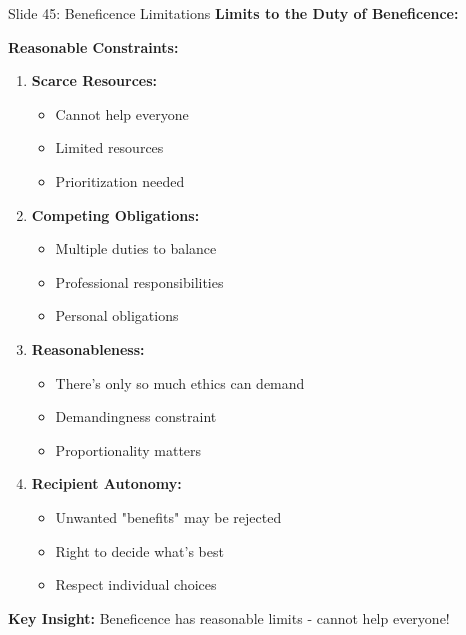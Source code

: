 \documentclass[8pt]{beamer}
\begin{document}
	\begin{frame}{Slide 45: Beneficence Limitations}
		\fontsize{6.5}{7.5}\selectfont
		\textbf{Limits to the Duty of Beneficence:}
		
		\vspace{0.1cm}
		\textbf{Reasonable Constraints:}
		\begin{enumerate}
			\item \textbf{Scarce Resources:}
			\begin{itemize}
				\item Cannot help everyone
				\item Limited resources
				\item Prioritization needed
			\end{itemize}
			\item \textbf{Competing Obligations:}
			\begin{itemize}
				\item Multiple duties to balance
				\item Professional responsibilities
				\item Personal obligations
			\end{itemize}
			\item \textbf{Reasonableness:}
			\begin{itemize}
				\item There's only so much ethics can demand
				\item Demandingness constraint
				\item Proportionality matters
			\end{itemize}
			\item \textbf{Recipient Autonomy:}
			\begin{itemize}
				\item Unwanted "benefits" may be rejected
				\item Right to decide what's best
				\item Respect individual choices
			\end{itemize}
		\end{enumerate}
		
		\textcolor{myblue}{\textbf{Key Insight:}} Beneficence has \textcolor{myblue}{reasonable limits} - cannot help everyone!
	\end{frame}
	
\end{document}
